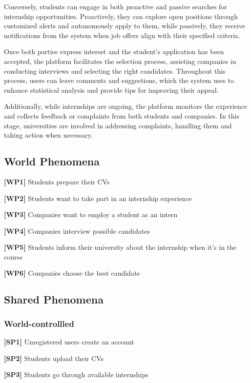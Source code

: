 Conversely, students can engage in both proactive and passive searches for internship opportunities. Proactively, they can explore open positions through customized alerts and autonomously apply to them, while passively, they receive notifications from the system when job offers align with their specified criteria.

Once both parties express interest and the student's application has been accepted, the platform facilitates the selection process, assisting companies in conducting interviews and selecting the right candidates. Throughout this process, users can leave comments and suggestions, which the system uses to enhance statistical analysis and provide tips for improving their appeal.

Additionally, while internships are ongoing, the platform monitors the experience and collects feedback or complaints from both students and companies. In this stage, universities are involved in addressing complaints, handling them and taking action when necessary.

\subsection{World Phenomena}
\textbf{[WP1]} Students prepare their CVs

\textbf{[WP2]} Students want to take part in an internship experience 

\textbf{[WP3]} Companies want to employ a student as an intern 

\textbf{[WP4]} Companies interview possible candidates 

\textbf{[WP5]} Students inform their university about the internship when it's in the course

\textbf{[WP6]} Companies choose the best candidate

\subsection{Shared Phenomena}

\subsubsection{World-controllled}

\textbf{[SP1]} Unregistered users create an account

\textbf{[SP2]} Students upload their CVs

\textbf{[SP3]} Students go through available internships

